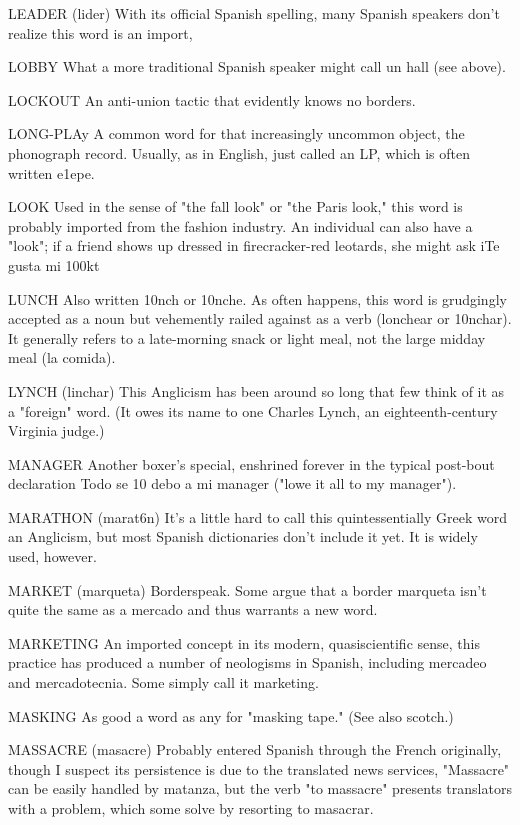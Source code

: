 LEADER (lider) With its official Spanish spelling, many Spanish speakers don't realize this word is an import,

LOBBY What a more traditional Spanish speaker might call
un hall (see above).

LOCKOUT An anti-union tactic that evidently knows no
borders.

LONG-PLAy A common word for that increasingly uncommon object, the phonograph record. Usually, as in English, just called
an LP, which is often written e1epe.

LOOK Used in the sense of "the fall look" or "the Paris
look," this word is probably imported from the fashion industry. An
individual can also have a "look"; if a friend shows up dressed in
firecracker-red leotards, she might ask iTe gusta mi 100kt

LUNCH Also written 10nch or 10nche. As often happens, this
word is grudgingly accepted as a noun but vehemently railed against as
a verb (lonchear or 10nchar). It generally refers to a late-morning snack
or light meal, not the large midday meal (la comida).

LYNCH (linchar) This Anglicism has been around so long that
few think of it as a "foreign" word. (It owes its name to one Charles
Lynch, an eighteenth-century Virginia judge.)

MANAGER Another boxer's special, enshrined forever in the
typical post-bout declaration Todo se 10 debo a mi manager ("lowe it
all to my manager").

MARATHON (marat6n) It's a little hard to call this quintessentially Greek word an Anglicism, but most Spanish dictionaries
don't include it yet. It is widely used, however.

MARKET (marqueta) Borderspeak. Some argue that a border
marqueta isn't quite the same as a mercado and thus warrants a
new word.

MARKETING An imported concept in its modern, quasiscientific sense, this practice has produced a number of neologisms
in Spanish, including mercadeo and mercadotecnia. Some simply call
it marketing.

MASKING As good a word as any for "masking tape." (See
also scotch.)

MASSACRE (masacre) Probably entered Spanish through the
French originally, though I suspect its persistence is due to the translated news services, "Massacre" can be easily handled by matanza, but
the verb "to massacre" presents translators with a problem, which
some solve by resorting to masacrar.

